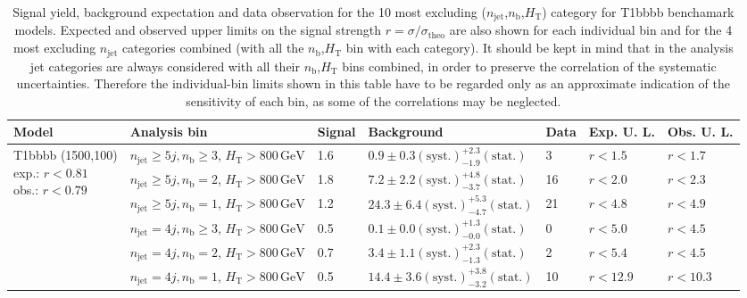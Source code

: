 \clearpage
\begin{table}[h!] 
  \scriptsize
  \caption{ 
  Signal yield, background expectation and data observation for the 10 most excluding ($n_{\mathrm{jet}}$,$n_{\mathrm{b}}$,$H_{\mathrm{T}}$) category for T1bbbb benchamark models. 
  Expected and observed upper limits on the signal strength $r=\sigma/\sigma_{\mathrm{theo}}$ are also shown 
  for each individual bin and for the 4 most excluding $n_{\mathrm{jet}}$ categories combined (with all the $n_{\mathrm{b}}$,$H_{\mathrm{T}}$ bin with each category).
  It should be kept in mind that in the analysis jet categories are always considered with all their $n_{\mathrm{b}}$,$H_{\mathrm{T}}$ bins 
  combined, in order to preserve the correlation of the systematic uncertainties. 
  Therefore the individual-bin limits shown in this table have to be regarded only as an approximate indication 
  of the sensitivity of each bin, as some of the correlations may be neglected.
  \label{tab:sigBenchmarksYields_T1bbbb}}
  \centering 
  \begin{tabular}{ lllllll } 
    \hline 
    \hline 
    Model & Analysis bin & Signal & Background & Data & Exp. U. L. & Obs. U. L. \\ \hline
\multirow{10}{*}{\parbox[t]{2cm}{T1bbbb (1500,100)\\exp.: $r<0.81$\\obs.: $r<0.79$}}
 & $n_{\mathrm{jet}} \geq5j,n_{\mathrm{b}} \geq3$, $H_{\mathrm{T}} > 800 \, \mathrm{GeV}$ & 1.6 & $0.9 \pm 0.3 \mathrm{(syst.)} ^{+2.3}_{-1.9} \mathrm{(stat.)}$ & 3 & $r < 1.5$ & $r < 1.7$\\ 
 & $n_{\mathrm{jet}} \geq5j,n_{\mathrm{b}} =2$, $H_{\mathrm{T}} > 800 \, \mathrm{GeV}$ & 1.8 & $7.2 \pm 2.2 \mathrm{(syst.)} ^{+4.8}_{-3.7} \mathrm{(stat.)}$ & 16 & $r < 2.0$ & $r < 2.3$\\ 
 & $n_{\mathrm{jet}} \geq5j,n_{\mathrm{b}} =1$, $H_{\mathrm{T}} > 800 \, \mathrm{GeV}$ & 1.2 & $24.3 \pm 6.4 \mathrm{(syst.)} ^{+5.3}_{-4.7} \mathrm{(stat.)}$ & 21 & $r < 4.8$ & $r < 4.9$\\ 
 & $n_{\mathrm{jet}} =4j,n_{\mathrm{b}} \geq3$, $H_{\mathrm{T}} > 800 \, \mathrm{GeV}$ & 0.5 & $0.1 \pm 0.0 \mathrm{(syst.)} ^{+1.3}_{-0.0} \mathrm{(stat.)}$ & 0 & $r < 5.0$ & $r < 4.5$\\ 
 & $n_{\mathrm{jet}} =4j,n_{\mathrm{b}} =2$, $H_{\mathrm{T}} > 800 \, \mathrm{GeV}$ & 0.7 & $3.4 \pm 1.1 \mathrm{(syst.)} ^{+2.3}_{-1.3} \mathrm{(stat.)}$ & 2 & $r < 5.4$ & $r < 4.5$\\ 
 & $n_{\mathrm{jet}} =4j,n_{\mathrm{b}} =1$, $H_{\mathrm{T}} > 800 \, \mathrm{GeV}$ & 0.5 & $14.4 \pm 3.6 \mathrm{(syst.)} ^{+3.8}_{-3.2} \mathrm{(stat.)}$ & 10 & $r < 12.9$ & $r < 10.3$\\ 

\end{tabular}
\end{table}
